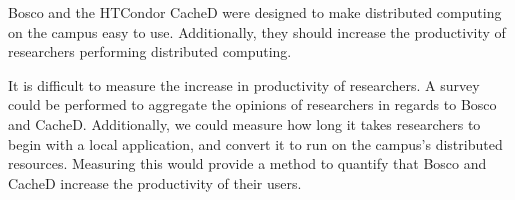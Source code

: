 Bosco and the HTCondor CacheD were designed to make distributed computing on the campus easy to use.  Additionally, they should increase the productivity of researchers performing distributed computing.

It is difficult to measure the increase in productivity of researchers.  A survey could be performed to aggregate the opinions of researchers in regards to Bosco and CacheD.  Additionally, we could measure how long it takes researchers to begin with a local application, and convert it to run on the campus's distributed resources.  Measuring this would provide a method to quantify that Bosco and CacheD increase the productivity of their users.







